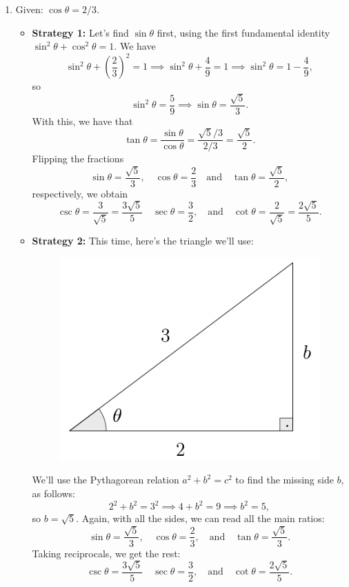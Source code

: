 \documentclass{ximera}
\begin{document}
\begin{example}
\begin{enumerate}[label=\alph*.]
  \item Given: $\cos\theta = 2/3$.

    \begin{explanation}
      \begin{itemize}
      \item {\bf Strategy 1:}       Let's find $\sin\theta$ first, using the first fundamental identity $\sin^2\theta+\cos^2\theta=1$. We have $$\sin^2\theta +\left(\frac{2}{3}\right)^2=1 \implies \sin^2\theta+\frac{4}{9}=1 \implies \sin^2\theta = 1-\frac{4}{9},$$so $$\sin^2\theta = \frac{5}{9} \implies \sin\theta = \frac{\sqrt{5}}{3}.$$ With this, we have that \[   \tan\theta = \frac{\sin\theta}{\cos\theta} = \frac{\sqrt{5}/3}{2/3} = \frac{\sqrt{5}}{2}.  \]Flipping the fractions $$\sin\theta = \frac{\sqrt{5}}{3}, \quad \cos\theta = \frac{2}{3} \quad\mbox{and}\quad \tan\theta = \frac{\sqrt{5}}{2},$$respectively, we obtain $$\csc\theta = \frac{3}{\sqrt{5}}  =\frac{3\sqrt{5}}{5} \quad \sec\theta = \frac{3}{2},\quad\mbox{and}\quad \cot\theta = \frac{2}{\sqrt{5}}=\frac{2\sqrt{5}}{5}.$$
      \item {\bf Strategy 2:} This time, here's the triangle we'll use: \begin{figure}[h]
          \centering
          \includegraphics[scale=.3]{./figures/9-1-3-triangle-cos-2-3.png}
        \end{figure} 
        We'll use the Pythagorean relation $a^2+b^2=c^2$ to find the missing side $b$, as follows: $$2^2+b^2=3^2\implies 4+b^2=9\implies b^2=5,$$so $b=\sqrt{5}$. Again, with all the sides, we can read all the main ratios: $$\sin\theta = \frac{\sqrt{5}}{3},\quad\cos\theta=\frac{2}{3},\quad\mbox{and}\quad\tan\theta=\frac{\sqrt{5}}{3}.$$Taking reciprocals, we get the rest:$$\csc\theta = \frac{3\sqrt{5}}{5} \quad \sec\theta = \frac{3}{2},\quad\mbox{and}\quad \cot\theta=\frac{2\sqrt{5}}{5}.$$
      \end{itemize}
    \end{explanation}
    

\end{enumerate}
\end{example}
\end{document}
